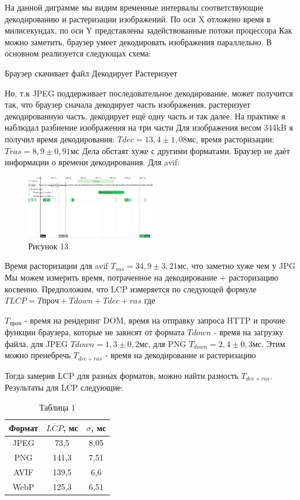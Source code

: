\documentclass[12pt]{article}
\begin{document}
    На данной диграмме мы видим временные интервалы соответствующие декодированию и растеризации изображений.
    По оси X отложено время в милисекундах, по оси Y представлены задействованные потоки процессора
    Как можно заметить, браузер умеет декодировать изображения параллельно.
    В основном реализуется следующах схема:

    Браузер скачивает файл
    Декодирует
    Растеризует

    Но, т.к JPEG поддерживает последовательное декодирование, может получится так, что браузер сначала декодирует часть изображения,
    растеризует декодированную часть, декодирует ещё одну часть и так далее. На практике я наблюдал разбиение изображения на три части
    Для изображения весом 344kB я получил время декодирования: $T{dec}=13,4 \pm 1,08мс$, время расторизации: $T{ras}=8,9 \pm 0,91мс$
    Дела обстаят хуже с другими форматами. Браузер не даёт информации о времени декодирования.
    Для avif:
    \begin{figure}[h!]
        \centering
        \includegraphics[width=0.5\textwidth]{../images/image_comp/avif_one_image.png}
        \caption{Рисунок 13}
    \end{figure}

    Время расторизации для avif $T_{ras}=34,9 \pm 3,21мс$, что заметно хуже чем у JPG
    Мы можем измерить время, потраченное на декодирование + расторизацию косвенно. Предположим, что LCP измеряется по следующей формуле
$
T{LCP} = T{проч} + T{down} + T{dec+ras}
$
    где

$T_{проч}$ - время на рендеринг DOM, время на отправку запроса HTTP и прочие функции браузера, которые не зависят от формата
$T{down}$ - время на загрузку файла, для JPEG $T{down} = 1,3 \pm 0,2 мс$, для PNG $T_{down} = 2,4 \pm 0,3 мс$. Этим можно пренебречь
$T_{dec+ras}$ - время на декодирование и растеризацию

    Тогда замерив LCP для разных форматов, можно найти разность $T_{dec+ras}$.
    Результаты для LCP следующие:
    \begin{table}[h!]
        \centering
        \caption{Таблица 1}
        \begin{tabular}{|c|c|c|}
            \hline
            Формат & $\overline{LCP}$, мс & $\sigma$, мс \\
            \hline
            JPEG   & 73,5                 & 8,05         \\
            \hline
            PNG    & 141,3                & 7,51         \\
            \hline
            AVIF   & 139,5                & 6,6          \\
            \hline
            WebP   & 125,3                & 6,51         \\
            \hline
        \end{tabular}
    \end{table}
\end{document}
